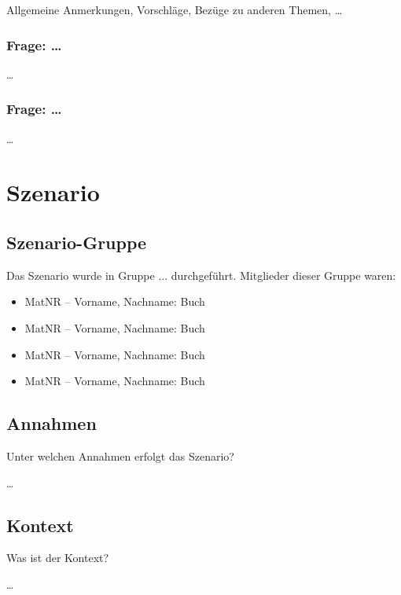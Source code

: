 \documentclass[twoside, a4paper, DIV=11, open=any, bibliography=totoc]{scrbook}
\begin{document}
Allgemeine Anmerkungen, Vorschläge, Bezüge zu anderen Themen, \ldots

\subsection{Frage: \ldots}

\ldots

\subsection{Frage: \ldots}

\ldots


\chapter{Szenario} \label{chap:szenario}

\section{Szenario-Gruppe} \label{sec:szengruppe}

Das Szenario wurde in Gruppe ... durchgeführt. Mitglieder dieser Gruppe waren:

\begin{itemize}
    \item MatNR – Vorname, Nachname: Buch
    \item MatNR – Vorname, Nachname: Buch
    \item MatNR – Vorname, Nachname: Buch
    \item MatNR – Vorname, Nachname: Buch
\end{itemize}

\section{Annahmen} \label{sec:szenannahmen}

Unter welchen Annahmen erfolgt das Szenario?

\ldots

\section{Kontext} \label{sec:szenkontext}

Was ist der Kontext?

\ldots
\end{document}
